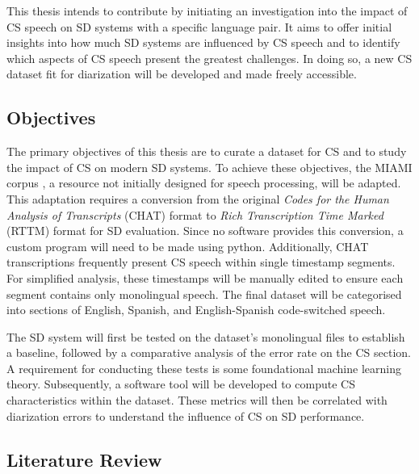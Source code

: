 \documentclass[11pt, a4paper]{report}
\begin{document}
\vspace*{10pt}
This thesis intends to contribute by initiating 
an investigation into the impact of CS speech on SD systems with a specific 
language pair. It aims to offer initial insights into how much SD systems are 
influenced by CS speech and to identify which aspects of CS speech present the 
greatest challenges. In doing so, a new CS dataset fit for diarization will be 
developed and made freely accessible.

\vspace*{10pt}

\subsection*{Objectives}

The primary objectives of this thesis are to curate a dataset for CS and to study the 
impact of CS on modern SD systems. To achieve these objectives, the MIAMI corpus 
\cite{deucharMiamiCorpusDocumentation}, a resource not initially designed for speech 
processing, will be adapted. This adaptation requires a conversion from the original \textit{Codes for the 
Human Analysis of Transcripts} (CHAT) format to \textit{Rich Transcription Time Marked} (RTTM) format for 
SD evaluation. Since no software provides this conversion, a custom program will need to be made 
using python. Additionally, CHAT transcriptions frequently present CS speech within 
single timestamp segments. For simplified analysis, these timestamps will be manually edited
to ensure each segment contains only monolingual speech. The final dataset will be 
categorised into sections of English, Spanish, and English-Spanish code-switched speech.

\vspace*{10pt}
The SD system will first be tested on the dataset's monolingual files to establish a
baseline, followed by a comparative analysis of the error rate on the CS section.
A requirement for conducting these tests is some foundational machine learning theory.
Subsequently, a software tool will be developed to compute CS characteristics within the 
dataset. These metrics will then be correlated with diarization errors to understand the 
influence of CS on SD performance.


\subsection*{Literature Review}
\end{document}
